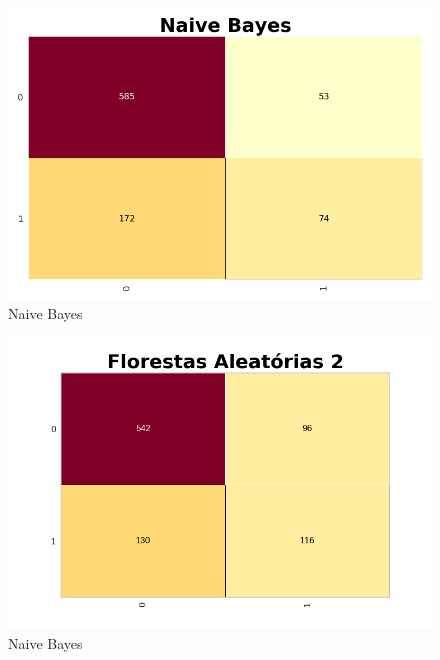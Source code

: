\documentclass[compress]{beamer}
\begin{document}
\begin{frame}
    \begin{figure}
        \centering
        \includegraphics[scale=.5]{img/ConfusionMatrix Naive Bayes 2.png}
        \caption{Naive Bayes}
        \label{fig:my_label}
    \end{figure}
\end{frame}

\begin{frame}
    \begin{figure}
        \centering
        \includegraphics[scale=.5]{img/ConfusionMatrix Florestas.png}
        \caption{Naive Bayes}
        \label{fig:my_label}
    \end{figure}
\end{frame}
\end{document}
